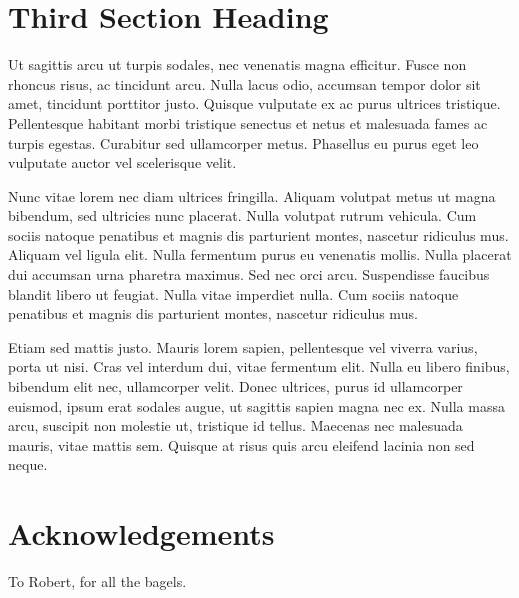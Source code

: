 \documentclass{acmsiggraph} %
\begin{document}
\section{Third Section Heading}

Ut sagittis arcu ut turpis sodales, nec venenatis magna efficitur. Fusce non rhoncus risus, ac tincidunt arcu. Nulla lacus odio, accumsan tempor dolor sit amet, tincidunt porttitor justo. Quisque vulputate ex ac purus ultrices tristique. Pellentesque habitant morbi tristique senectus et netus et malesuada fames ac turpis egestas. Curabitur sed ullamcorper metus. Phasellus eu purus eget leo vulputate auctor vel scelerisque velit.

Nunc vitae lorem nec diam ultrices fringilla. Aliquam volutpat metus ut magna bibendum, sed ultricies nunc placerat. Nulla volutpat rutrum vehicula. Cum sociis natoque penatibus et magnis dis parturient montes, nascetur ridiculus mus. Aliquam vel ligula elit. Nulla fermentum purus eu venenatis mollis. Nulla placerat dui accumsan urna pharetra maximus. Sed nec orci arcu. Suspendisse faucibus blandit libero ut feugiat. Nulla vitae imperdiet nulla. Cum sociis natoque penatibus et magnis dis parturient montes, nascetur ridiculus mus.

Etiam sed mattis justo. Mauris lorem sapien, pellentesque vel viverra varius, porta ut nisi. Cras vel interdum dui, vitae fermentum elit. Nulla eu libero finibus, bibendum elit nec, ullamcorper velit. Donec ultrices, purus id ullamcorper euismod, ipsum erat sodales augue, ut sagittis sapien magna nec ex. Nulla massa arcu, suscipit non molestie ut, tristique id tellus. Maecenas nec malesuada mauris, vitae mattis sem. Quisque at risus quis arcu eleifend lacinia non sed neque.

\section*{Acknowledgements}

To Robert, for all the bagels.


\nocite{*}

\end{document}
